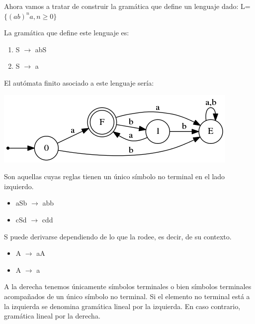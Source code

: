 \documentclass{apuntes}
\begin{document}
\begin{example}
Ahora vamos a tratar de construir la gramática que define un lenguaje dado:
L=$\lbrace (ab)^na, n \geq 0 \rbrace$

La gramática que define este lenguaje es:
\begin{enumerate}
\item S $\rightarrow$ abS
\item S $\rightarrow$ a
\end{enumerate}

El autómata finito asociado a este lenguaje sería:
\begin{center}
\includegraphics[scale=0.75]{automata1.png}
\end{center}
\end{example}


\begin{defn}
Son aquellas cuyas reglas tienen un único símbolo no terminal en el lado izquierdo.
\end{defn}


\begin{example}
\begin{itemize}
\item aSb $\rightarrow$ abb
\item cSd $\rightarrow$ cdd
\end{itemize}
S puede derivarse dependiendo de lo que la rodee, es decir, de su contexto.
\end{example}

\begin{example}
\begin{itemize}
\item A $\rightarrow$ aA
\item A $\rightarrow$ a
\end{itemize}
A la derecha tenemos únicamente símbolos terminales o bien símbolos terminales acompañados de un único símbolo no terminal.
Si el elemento no terminal está a la izquierda se denomina gramática lineal por la izquierda. En caso contrario, gramática lineal por la derecha.
\end{example}
\end{document}
